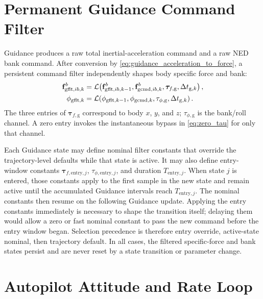 \section{Permanent Guidance Command Filter}
\label{sec:guidance_command_filter}

Guidance produces a raw total inertial-acceleration command and a raw NED bank
command. After conversion by \cref{eq:guidance_acceleration_to_force}, a
persistent command filter independently shapes body specific force and bank:
\begin{align}
\mathbf{f}_{\mathrm{gflt},ib,k}^{b}
&=
\mathcal{L}\!\left(
\mathbf{f}_{\mathrm{gflt},ib,k-1}^{b},
\mathbf{f}_{\mathrm{gcmd},ib,k}^{b},
\boldsymbol{\tau}_{f,\mathrm{g}},
\Delta t_{\mathrm{g},k}
\right),\\
\phi_{\mathrm{gflt},k}
&=
\mathcal{L}\!\left(
\phi_{\mathrm{gflt},k-1},
\phi_{\mathrm{gcmd},k},
\tau_{\phi,\mathrm{g}},
\Delta t_{\mathrm{g},k}
\right).
\label{eq:guidance_command_filter}
\end{align}
The three entries of $\boldsymbol{\tau}_{f,\mathrm{g}}$ correspond to body
$x$, $y$, and $z$; $\tau_{\phi,\mathrm{g}}$ is the bank/roll channel. A zero
entry invokes the instantaneous bypass in \cref{eq:zero_tau} for only that
channel.

Each Guidance state may define nominal filter constants that override the
trajectory-level defaults while that state is active. It may also define
entry-window constants
$\boldsymbol{\tau}_{f,\mathrm{entry},j}$,
$\tau_{\phi,\mathrm{entry},j}$, and duration $T_{\mathrm{entry},j}$. When state
$j$ is entered, those constants apply to the first sample in the new state and
remain active until the accumulated Guidance intervals reach
$T_{\mathrm{entry},j}$. The nominal constants then resume on the following
Guidance update. Applying the entry constants immediately is necessary to
shape the transition itself; delaying them would allow a zero or fast nominal
constant to pass the new command before the entry window began. Selection
precedence is therefore entry override, active-state nominal, then trajectory
default. In all cases, the filtered specific-force and bank states persist and
are never reset by a state transition or parameter change.

\section{Autopilot Attitude and Rate Loop}

